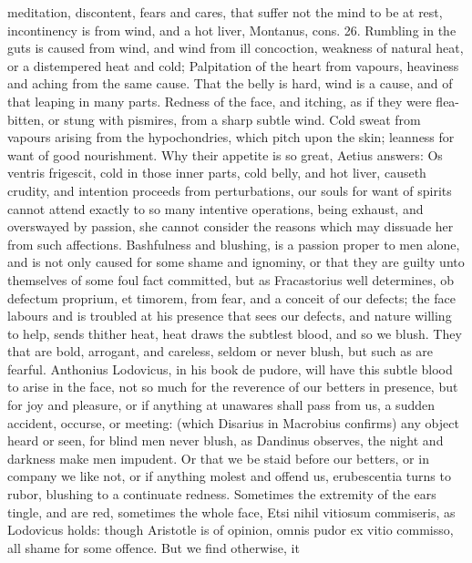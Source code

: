 {meditation, discontent, fears and cares, that suffer not the mind to be
at rest, incontinency is from wind, and a hot liver, Montanus, cons.
26. Rumbling in the guts is caused from wind, and wind from ill
concoction, weakness of natural heat, or a distempered heat and cold;
Palpitation of the heart from vapours, heaviness and aching from
the same cause. That the belly is hard, wind is a cause, and of that
leaping in many parts. Redness of the face, and itching, as if they
were flea-bitten, or stung with pismires, from a sharp subtle wind.
Cold sweat from vapours arising from the hypochondries, which
pitch upon the skin; leanness for want of good nourishment. Why their
appetite is so great, Aetius answers: Os ventris frigescit, cold
in those inner parts, cold belly, and hot liver, causeth crudity, and
intention proceeds from perturbations, our souls for want of
spirits cannot attend exactly to so many intentive operations, being
exhaust, and overswayed by passion, she cannot consider the reasons
which may dissuade her from such affections.
Bashfulness and blushing, is a passion proper to men alone, and
is not only caused for some shame and ignominy, or that they are
guilty unto themselves of some foul fact committed, but as
Fracastorius well determines, ob defectum proprium, et timorem,
from fear, and a conceit of our defects; the face labours and is
troubled at his presence that sees our defects, and nature willing to
help, sends thither heat, heat draws the subtlest blood, and so we
blush. They that are bold, arrogant, and careless, seldom or never
blush, but such as are fearful. Anthonius Lodovicus, in his book de
pudore, will have this subtle blood to arise in the face, not so much
for the reverence of our betters in presence, but for joy and
pleasure, or if anything at unawares shall pass from us, a sudden
accident, occurse, or meeting: (which Disarius in  Macrobius
confirms) any object heard or seen, for blind men never blush, as
Dandinus observes, the night and darkness make men impudent. Or that we
be staid before our betters, or in company we like not, or if anything
molest and offend us, erubescentia turns to rubor, blushing to a
continuate redness. Sometimes the extremity of the ears tingle,
and are red, sometimes the whole face, Etsi nihil vitiosum commiseris,
as Lodovicus holds: though Aristotle is of opinion, omnis pudor ex
vitio commisso, all shame for some offence. But we find otherwise, it
}
